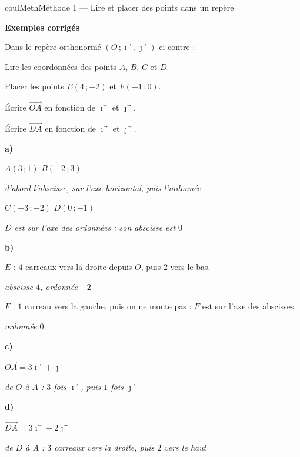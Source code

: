 \documentclass[11pt,a4paper]{article}
\makeatletter
\newcommand{\vect}[1]{\overrightarrow{#1}}
\newcommand{\pt}[3]{\path (#1) node[croix]{} node[#2,font=\small,inner sep=2.5pt]{$#3$};}
\newcommand{\lycee@repere}[4]{%
  \draw[grille,step=1] (#1,#2) grid (#3,#4);
  \draw[-{Stealth[length=2mm]},thick] (#1,0)--({#3+0.4},0) node[below left=-1pt]{$x$};
  \draw[-{Stealth[length=2mm]},thick] (0,#2)--(0,{#4+0.4}) node[below left=-1pt]{$y$};
  \node[below left,font=\scriptsize,inner sep=1.5pt] at (0,0) {$0$};}
\newcommand{\lycee@gradx}[1]{\foreach \k/\l in {#1}{%
  \draw (\k,0.07)--(\k,-0.07) node[below,font=\scriptsize,inner sep=1.5pt]{$\l$};}}
\newcommand{\lycee@grady}[1]{\foreach \k/\l in {#1}{%
  \draw (0.07,\k)--(-0.07,\k) node[left,font=\scriptsize,inner sep=1.5pt]{$\l$};}}
\providecommand{\repere}{\lycee@repere}%
\providecommand{\gradx}{\lycee@gradx}%
\providecommand{\grady}{\lycee@grady}%
\newcounter{lycee@signet}
\newcommand{\signet}[3][]{\stepcounter{lycee@signet}%
  \edef\lycee@dest{\if\relax\detokenize{#1}\relax
    signet.\arabic{lycee@signet}\else#1\fi}%
  \hypertarget{\lycee@dest}{}\bookmark[level=#2,dest=\lycee@dest]{#3}}
\def\vec#1{#1⃗}}%
\newcommand{\res}[1]{#1}
\newcounter{methode}
\newenvironment{methodebox}[1][Méthode]{\stepcounter{methode}%
  \begin{boitecours}[phantom={\signet[methode-\arabic{methode}]{2}{#1}}]{coulMeth}{#1}}%
  {\end{boitecours}}
\newcommand{\etape}[1]{\par\smallskip\textbf{\color{coulMeth}#1}\par\nobreak\smallskip}
\newcommand{\explique}[2]{\par\smallskip\noindent
  \begin{minipage}[t]{0.57\linewidth}\raggedright #1\end{minipage}\hfill
  \begin{minipage}[t]{0.40\linewidth}\raggedright\leavevmode
    {\small\itshape\color{black!60}#2}\end{minipage}\par}
\newcommand{\cas}[1]{\par\smallskip\noindent\textbf{\color{coulExo}#1}\vadjust{\nobreak}}
\newenvironment{correction}{\par}{\par}
\newcommand{\etapeexemples}{\etape{Exemples corrigés}}
\makeatother
\begin{document}
\begin{methodebox}[Méthode 1 --- Lire et placer des points dans un repère]
\etapeexemples
\begin{minipage}[t]{0.55\linewidth}\raggedright
Dans le repère orthonormé $(O\,;\vec{\imath},\vec{\jmath})$ ci-contre :
\begin{questions}[label=\alph*)]
  \item Lire les coordonnées des points $A$, $B$, $C$ et $D$.
  \item Placer les points $E(4\,;-2)$ et $F(-1\,;0)$.
  \item Écrire $\vect{OA}$ en fonction de $\vec{\imath}$ et $\vec{\jmath}$.
  \item Écrire $\vect{DA}$ en fonction de $\vec{\imath}$ et $\vec{\jmath}$.
\end{questions}
\end{minipage}\hfill
\begin{minipage}[t]{0.42\linewidth}
\vspace{0pt}\centering
{}
\end{minipage}
\begin{correction}
\cas{a)}\par\nopagebreak
\explique{$\res{A(3\,;1)}$ \quad $\res{B(-2\,;3)}$}{d'abord l'abscisse, sur l'axe
horizontal, puis l'ordonnée}
\explique{$\res{C(-3\,;-2)}$ \quad $\res{D(0\,;-1)}$}{$D$ est sur l'axe des ordonnées :
son abscisse est $0$}
\cas{b)}\par\nopagebreak
\begin{minipage}[t]{0.6\linewidth}
\explique{$E$ : $4$ carreaux vers la droite depuis $O$, puis $2$ vers le bas.}{abscisse
$4$, ordonnée $-2$}
\explique{$F$ : $1$ carreau vers la gauche, puis on ne monte pas : $F$ est sur l'axe des
abscisses.}{ordonnée $0$}
\end{minipage}\hfill
\begin{minipage}[t]{0.36\linewidth}
\vspace{0pt}\centering
{}
\end{minipage}
\cas{c)}\par\nopagebreak
\explique{$\vect{OA}=\res{3\vec{\imath}+\vec{\jmath}}$}{de $O$ à $A$ : $3$ fois
$\vec{\imath}$, puis $1$ fois $\vec{\jmath}$}
\cas{d)}\par\nopagebreak
\explique{$\vect{DA}=\res{3\vec{\imath}+2\vec{\jmath}}$}{de $D$ à $A$ : $3$ carreaux vers
la droite, puis $2$ vers le haut}
\end{correction}


\end{methodebox}
\end{document}
